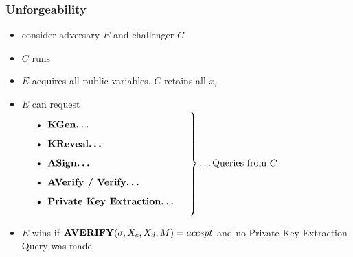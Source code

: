 \begin{frame}
	\frametitle{Unforgeability}

	\begin{itemize}
		\item consider adversary $E$ and challenger $C$
		\item $C$ runs \setup
		\item $E$ acquires all public variables, $C$ retains all $x_i$
		\item $E$ can request\\[.2cm]
			$\left.\parbox{.5\textwidth}{%
			\begin{itemize}
				\item \textbf{KGen\ldots}
				\item \textbf{KReveal\ldots}
				\item \textbf{ASign\ldots} 
				\item \textbf{AVerify / Verify\ldots}
				\item \textbf{Private Key Extraction\ldots}
			\end{itemize}%
			}\right\}\text{\ldots Queries from } C$
		\item $E$ wins if $\textbf{AVERIFY}(\sigma, X_c, X_d, M) = accept$ and no Private Key Extraction Query was made
		\end{itemize}
\end{frame}